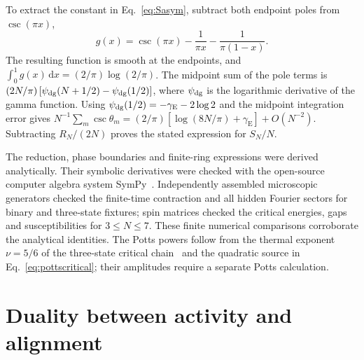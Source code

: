 \documentclass[aps,pre,reprint,amsmath,amssymb,longbibliography,floatfix]{revtex4-2}
\newcommand{\dd}{\,\mathrm d}
\begin{document}
To extract the constant in Eq.~\eqref{eq:Sasym}, subtract both endpoint
poles from $\csc(\pi x)$,
\begin{equation}
 g(x)=\csc(\pi x)-\frac1{\pi x}-\frac1{\pi(1-x)}.
\end{equation}
The resulting function is smooth at the endpoints, and
$\int_0^1g(x)\dd x=(2/\pi)\log(2/\pi)$.
The midpoint sum of the pole terms is
$(2N/\pi)\left[\psi_{\rm dg}(N+1/2)-\psi_{\rm dg}(1/2)\right]$, where $\psi_{\rm dg}$ is the logarithmic
derivative of the gamma function. Using
$\psi_{\rm dg}(1/2)=-\gamma_{\mathrm E}-2\log2$ and the midpoint integration
error gives
$N^{-1}\sum_m\csc\theta_m=(2/\pi)\left[\log(8N/\pi)+\gamma_{\mathrm E}\right]+O(N^{-2})$.
Subtracting $R_N/(2N)$ proves the stated expression for $S_N/N$.

The reduction, phase boundaries and finite-ring expressions were
derived analytically. Their symbolic derivatives were checked with the
open-source computer algebra system SymPy~\cite{SymPySoftware}.
Independently assembled microscopic generators checked the finite-time
contraction and all hidden Fourier sectors for binary and three-state
fixtures; spin matrices checked the critical energies, gaps and
susceptibilities for $3\leq N\leq7$. These finite numerical comparisons
corroborate the analytical identities. The Potts powers follow from the thermal exponent $\nu=5/6$ of the
three-state critical chain~\cite{KarraschSchuricht2017} and the quadratic
source in Eq.~\eqref{eq:pottscritical}; their amplitudes require a separate Potts calculation.

\section{Duality between activity and alignment}
\label{app:duality}
\end{document}
